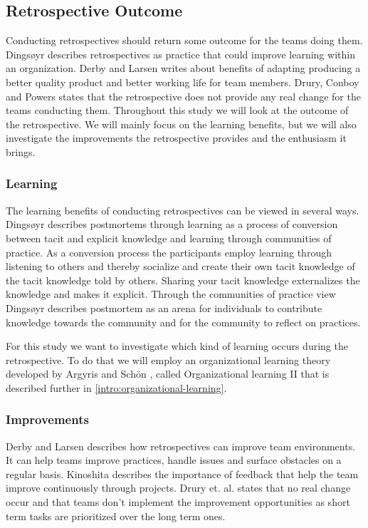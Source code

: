 \subsection{Retrospective Outcome}
Conducting retrospectives should return some outcome for the teams doing them. Dingsøyr \cite{Dingsoyr2004} describes retrospectives as practice that could improve learning within an organization. Derby and Larsen \cite{Larsen2006} writes about benefits of adapting producing a better quality product and better working life for team members. Drury, Conboy and Powers \cite{Drury2012} states that the retrospective does not provide any real change for the teams conducting them. Throughout this study we will look at the outcome of the retrospective. We will mainly focus on the learning benefits, but we will also investigate the improvements the retrospective provides and the enthusiasm it brings. 

\subsubsection{Learning}
The learning benefits of conducting retrospectives can be viewed in several ways. Dingsøyr \cite{Dingsoyr2004} describes postmortems through learning as a process of conversion between tacit and explicit knowledge and learning through communities of practice. As a conversion process the participants employ learning through listening to others and thereby socialize and create their own tacit knowledge of the tacit knowledge told by others. Sharing your tacit knowledge externalizes the knowledge and makes it explicit. Through the communities of practice view Dingsøyr describes postmortem as an arena for individuals to contribute knowledge towards the community and for the community to reflect on practices. 

For this study we want to investigate which kind of learning occurs during the retrospective. To do that we will employ an organizational learning theory developed by Argyris and Schön \cite{Argyris1996}, called Organizational learning II that is described further in \autoref{intro:organizational-learning}. 

\subsubsection{Improvements}
Derby and Larsen \cite{Larsen2006} describes how retrospectives can improve team environments. It can help teams improve practices, handle issues and surface obstacles on a regular basis. Kinoshita \cite{Kinoshita2008} describes the importance of feedback that help the team improve continuously through projects. Drury et. al. \cite{Drury2012} states that no real change occur and that teams don't implement the improvement opportunities as short term tasks are prioritized over the long term ones. 

